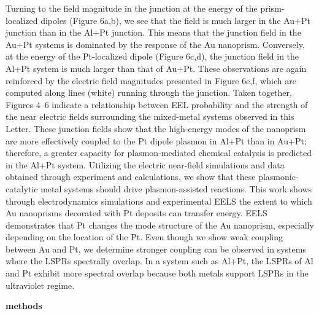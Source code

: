 \documentclass [11pt, proquest] {uwthesis}[2016/11/22]
\begin{document}
Turning to the field magnitude in the junction at the energy of the prism-localized dipoles (Figure 6a,b), we see that the field is much larger in the Au+Pt junction than in the Al+Pt junction. This means that the junction field in the Au+Pt systems is dominated by the response of the Au nanoprism. Conversely, at the energy of the Pt-localized dipole (Figure 6c,d), the junction field in the Al+Pt system is much larger than that of Au+Pt. These observations are again reinforced by the electric field magnitudes presented in Figure 6e,f, which are computed along lines (white) running through the junction. Taken together, Figures 4–6 indicate a relationship between EEL probability and the strength of the near electric fields surrounding the mixed-metal systems observed in this Letter. These junction fields show that the high-energy modes of the nanoprism are more effectively coupled to the Pt dipole plasmon in Al+Pt than in Au+Pt; therefore, a greater capacity for plasmon-mediated chemical catalysis is predicted in the Al+Pt system. Utilizing the electric near-field simulations and data obtained through experiment and calculations, we show that these plasmonic-catalytic metal systems should drive plasmon-assisted reactions.
This work shows through electrodynamics simulations and experimental EELS the extent to which Au nanoprisms decorated with Pt deposits can transfer energy. EELS demonstrates that Pt changes the mode structure of the Au nanoprism, especially depending on the location of the Pt. Even though we show weak coupling between Au and Pt, we determine stronger coupling can be observed in systems where the LSPRs spectrally overlap. In a system such as Al+Pt, the LSPRs of Al and Pt exhibit more spectral overlap because both metals support LSPRs in the ultraviolet regime.

{\bf methods}
\end{document}
